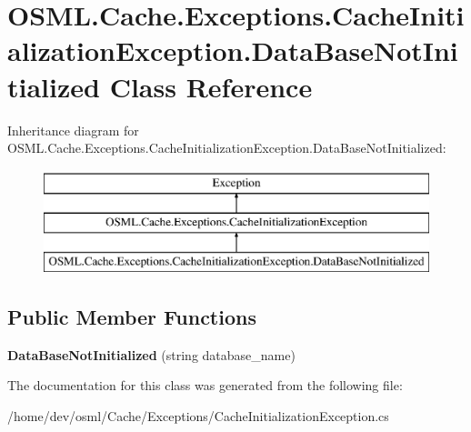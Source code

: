\hypertarget{classOSML_1_1Cache_1_1Exceptions_1_1CacheInitializationException_1_1DataBaseNotInitialized}{}\section{O\+S\+M\+L.\+Cache.\+Exceptions.\+Cache\+Initialization\+Exception.\+Data\+Base\+Not\+Initialized Class Reference}
\label{classOSML_1_1Cache_1_1Exceptions_1_1CacheInitializationException_1_1DataBaseNotInitialized}
Inheritance diagram for O\+S\+M\+L.\+Cache.\+Exceptions.\+Cache\+Initialization\+Exception.\+Data\+Base\+Not\+Initialized\+:\begin{figure}[H]
\begin{center}
\leavevmode
\includegraphics[height=3.000000cm]{classOSML_1_1Cache_1_1Exceptions_1_1CacheInitializationException_1_1DataBaseNotInitialized}
\end{center}
\end{figure}
\subsection*{Public Member Functions}
\begin{DoxyCompactItemize}
\item 
\mbox{\label{classOSML_1_1Cache_1_1Exceptions_1_1CacheInitializationException_1_1DataBaseNotInitialized_a521c49778698a9acef81606ce8b6e48d}} 
{\bfseries Data\+Base\+Not\+Initialized} (string database\+\_\+name)
\end{DoxyCompactItemize}


The documentation for this class was generated from the following file\+:\begin{DoxyCompactItemize}
\item 
/home/dev/osml/\+Cache/\+Exceptions/Cache\+Initialization\+Exception.\+cs\end{DoxyCompactItemize}
